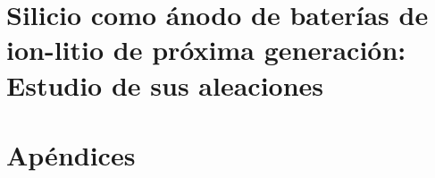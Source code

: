 \documentclass[12pt,spanish,a4paper,twoside]{book}
\begin{document}
% 





% 

% 


\part{Silicio como ánodo de baterías de ion-litio de próxima generación: Estudio de sus aleaciones}\label{p:silicio}

% 

% 



% 

%
%
%

\part{Apéndices}

\appendix
\renewcommand\chaptername{Apéndice}




\end{document}
